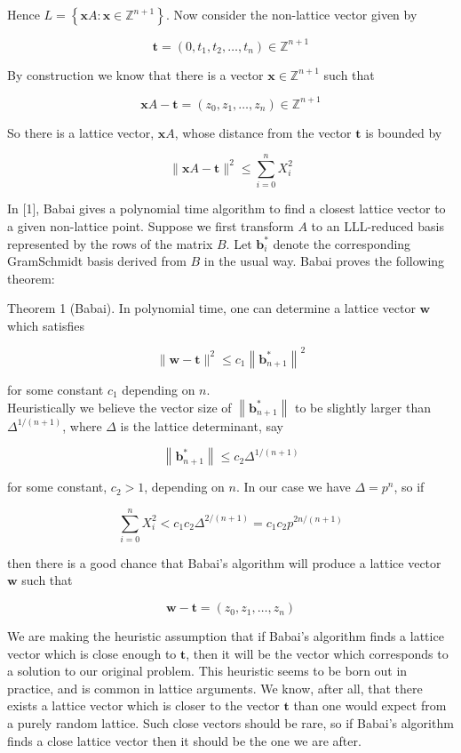 \documentclass[10pt]{article}
\begin{document}
Hence $L=\left\{\mathbf{x} A: \mathbf{x} \in \mathbb{Z}^{n+1}\right\}$. Now consider the non-lattice vector given by

$$
\mathbf{t}=\left(0, t_{1}, t_{2}, \ldots, t_{n}\right) \in \mathbb{Z}^{n+1}
$$

By construction we know that there is a vector $\mathbf{x} \in \mathbb{Z}^{n+1}$ such that

$$
\mathbf{x} A-\mathbf{t}=\left(z_{0}, z_{1}, \ldots, z_{n}\right) \in \mathbb{Z}^{n+1}
$$

So there is a lattice vector, $\mathbf{x} A$, whose distance from the vector $\mathbf{t}$ is bounded by

$$
\|\mathbf{x} A-\mathbf{t}\|^{2} \leq \sum_{i=0}^{n} X_{i}^{2}
$$

In [1], Babai gives a polynomial time algorithm to find a closest lattice vector to a given non-lattice point. Suppose we first transform $A$ to an LLL-reduced basis represented by the rows of the matrix $B$. Let $\mathbf{b}_{i}^{*}$ denote the corresponding GramSchmidt basis derived from $B$ in the usual way. Babai proves the following theorem:

Theorem 1 (Babai). In polynomial time, one can determine a lattice vector $\mathbf{w}$ which satisfies

$$
\|\mathbf{w}-\mathbf{t}\|^{2} \leq c_{1}\left\|\mathbf{b}_{n+1}^{*}\right\|^{2}
$$

for some constant $c_{1}$ depending on $n$.\\
Heuristically we believe the vector size of $\left\|\mathbf{b}_{n+1}^{*}\right\|$ to be slightly larger than $\Delta^{1 /(n+1)}$, where $\Delta$ is the lattice determinant, say

$$
\left\|\mathbf{b}_{n+1}^{*}\right\| \leq c_{2} \Delta^{1 /(n+1)}
$$

for some constant, $c_{2}>1$, depending on $n$. In our case we have $\Delta=p^{n}$, so if

$$
\sum_{i=0}^{n} X_{i}^{2}<c_{1} c_{2} \Delta^{2 /(n+1)}=c_{1} c_{2} p^{2 n /(n+1)}
$$

then there is a good chance that Babai's algorithm will produce a lattice vector $\mathbf{w}$ such that

$$
\mathbf{w}-\mathbf{t}=\left(z_{0}, z_{1}, \ldots, z_{n}\right)
$$

We are making the heuristic assumption that if Babai's algorithm finds a lattice vector which is close enough to $\mathbf{t}$, then it will be the vector which corresponds to a solution to our original problem. This heuristic seems to be born out in practice, and is common in lattice arguments. We know, after all, that there exists a lattice vector which is closer to the vector $\mathbf{t}$ than one would expect from a purely random lattice. Such close vectors should be rare, so if Babai's algorithm finds a close lattice vector then it should be the one we are after.
\end{document}
